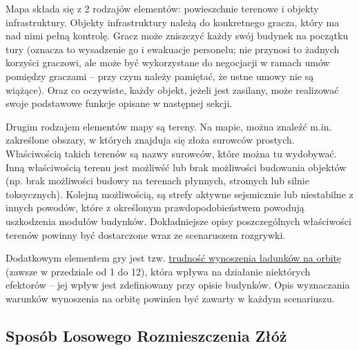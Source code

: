 \documentclass[11pt,a4paper]{article}
\begin{document}
Mapa składa się z 2 rodzajów elementów: powieszchnie terenowe i objekty infrastruktury. Objekty infrastruktury należą do konkretnego gracza, który ma nad nimi pełną kontrolę. Gracz może zniszczyć każdy swój budynek na początku tury (oznacza to wysadzenie go i ewakuacje personelu; nie przynosi to żadnych korzyści graczowi, ale może być wykorzystane do negocjacji w ramach umów pomiędzy graczami -- przy czym należy pamiętać, że ustne umowy nie są wiążące). Oraz co oczywiste, każdy objekt, jeżeli jest zasilany, może realizować swoje podstawowe funkcje opisane w następnej sekcji.

Drugim rodzajem elementów mapy są tereny. Na mapie, można znaleźć m.in. zakreślone obszary, w których znajduja się złoża surowców prostych. Właściwością takich terenów są nazwy surowców, które można tu wydobywać. Inną właściwością terenu jest możliwść lub brak możliwości budowania objektów (np. brak możliwości budowy na terenach płynnych, stromych lub silnie toksycznych). Kolejną możliwością, są strefy aktywne sejsmicznie lub niestabilne z innych powodów, które z określonym prawdopodobieństwem powodują uszkodzenia modułów budynków. Dokładniejsze opisy poszczególnych właściwości terenów powinny być dostarczone wraz ze scenaruszem rozgrywki.

Dodatkowym elementem gry jest tzw. \underline{trudność wynoszenia ładunków na orbitę} (zawsze w przedziale od 1 do 12), która wpływa na działanie niektórych efektorów -- jej wpływ jest zdefiniowany przy opisie budynków. Opis wyznaczania warunków wynoszenia na orbitę powinien być zawarty w każdym scenariuszu.

\newpage

\subsection{Sposób Losowego Rozmieszczenia Złóż}
\end{document}
